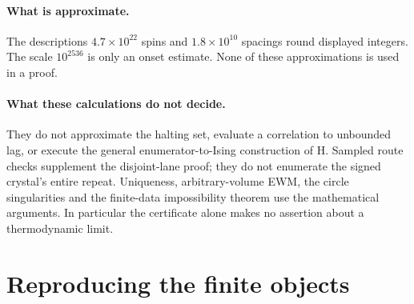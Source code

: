 \paragraph{What is approximate.}
The descriptions \(4.7\times10^{22}\) spins and \(1.8\times10^{10}\) spacings round displayed integers. The scale \(10^{2536}\) is only an onset estimate. None of these approximations is used in a proof.

\paragraph{What these calculations do not decide.}
They do not approximate the halting set, evaluate a correlation to unbounded lag, or execute the general enumerator-to-Ising construction of H. Sampled route checks supplement the disjoint-lane proof; they do not enumerate the signed crystal's entire repeat. Uniqueness, arbitrary-volume EWM, the circle singularities and the finite-data impossibility theorem use the mathematical arguments. In particular the certificate alone makes no assertion about a thermodynamic limit.

\clearpage
\section{Reproducing the finite objects}\label{sec:reproducibility}


